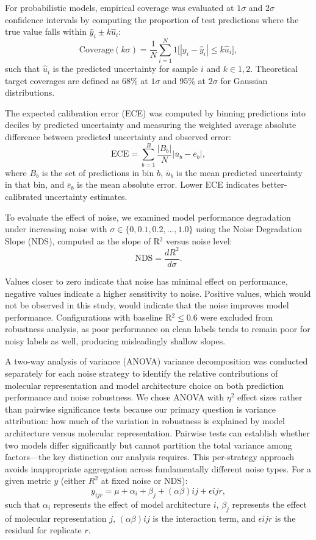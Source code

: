 \documentclass[pdflatex,sn-mathphys-num]{sn-jnl}%
\theoremstyle{thmstyleone}%
\theoremstyle{thmstyletwo}%
\theoremstyle{thmstylethree}%
\begin{document}
For probabilistic models, empirical coverage was evaluated at $1\sigma$ and $2\sigma$ confidence intervals by computing the proportion of test predictions where the true value falls within $\hat{y}_i \pm k\hat{u}_i$:
$$
\text{Coverage}(k\sigma) = \frac{1}{N}\sum_{i=1}^{N} 1\big[|y_i - \hat{y}_i| \leq k\hat{u}_i\big],
$$
such that $\hat{u}_i$ is the predicted uncertainty for sample $i$ and $k \in {1, 2}$. Theoretical target coverages are defined as 68\% at $1\sigma$ and 95\% at $2\sigma$ for Gaussian distributions.

The expected calibration error (ECE) was computed by binning predictions into deciles by predicted uncertainty and measuring the weighted average absolute difference between predicted uncertainty and observed error:
$$
\text{ECE} = \sum_{b=1}^{B} \frac{|B_b|}{N} \big| \bar{u}_b - \bar{e}_b \big|,
$$
where $B_b$ is the set of predictions in bin $b$, $\bar{u}_b$ is the mean predicted uncertainty in that bin, and $\bar{e}_b$ is the mean absolute error. Lower ECE indicates better-calibrated uncertainty estimates.


To evaluate the effect of noise, we examined model performance degradation under increasing noise with $\sigma \in \{0, 0.1, 0.2, \ldots, 1.0\}$ using the Noise Degradation Slope (NDS), computed as the slope of R$^2$ versus noise level:
$$
\text{NDS} = \frac{dR^2}{d\sigma}.
$$

Values closer to zero indicate that noise has minimal effect on performance, negative values indicate a higher sensitivity to noise. Positive values, which would not be observed in this study, would indicate that the noise improves model performance. Configurations with baseline R$^2 \leq 0.6$ were excluded from robustness analysis, as poor performance on clean labels tends to remain poor for noisy labels as well, producing misleadingly shallow slopes.

A two-way analysis of variance (ANOVA) variance decomposition was conducted separately for each noise strategy to identify the relative contributions of molecular representation and model architecture choice on both prediction performance and noise robustness. We chose ANOVA with $\eta^2$ effect sizes rather than pairwise significance tests because our primary question is variance attribution: how much of the variation in robustness is explained by model architecture versus molecular representation. Pairwise tests can establish whether two models differ significantly but cannot partition the total variance among factors---the key distinction our analysis requires. This per-strategy approach avoids inappropriate aggregation across fundamentally different noise types. For a given metric $y$ (either $R^2$ at fixed noise or NDS):
$$
y_{ijr} = \mu + \alpha_i + \beta_j + (\alpha\beta){ij} + \epsilon{ijr},
$$
such that $\alpha_i$ represents the effect of model architecture $i$, $\beta_j$ represents the effect of molecular representation $j$, $(\alpha\beta){ij}$ is the interaction term, and $\epsilon{ijr}$ is the residual for replicate $r$.
\end{document}
